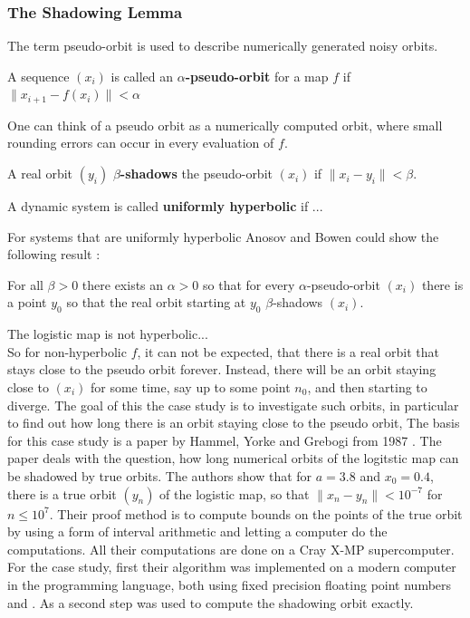  \subsubsection{The Shadowing Lemma}
 The term pseudo-orbit is used to describe numerically generated noisy orbits. 
 \begin{definition}\label{def:pseudoorbit}
 A sequence $(x_i)$ is called an \textbf{$\alpha$-pseudo-orbit} for a map $f$ if
 $ \| x_{i+1} - f(x_i) \| < \alpha $  
 \end{definition}
 One can think of a pseudo orbit as a numerically computed orbit, where small rounding errors can occur in every evaluation of $f$.
  \begin{definition}\label{def:shadowing}
	A real orbit $(y_i)$ \textbf{$\beta$-shadows} the pseudo-orbit $(x_i)$ if 
	$\| x_i - y_i \| < \beta$.  
 \end{definition}
 \begin{definition}
 A dynamic system is called \textbf{uniformly hyperbolic} if ...
 \end{definition}
  For systems that are uniformly hyperbolic Anosov and Bowen could show the following result \cite{anosov1967} \cite{Bowen1975} \cite{Hasselblatt:2008}:
  \begin{theorem}
  For all $\beta > 0$ there exists an $\alpha > 0$ so that for every $\alpha$-pseudo-orbit $(x_i)$ there is a point $y_0$ so that the real orbit starting at $y_0$ $\beta$-shadows $(x_i)$.
  \end{theorem} 
  The logistic map is not hyperbolic...\\
  So for non-hyperbolic $f$, it can not be expected, that there is a real orbit that stays close to the pseudo orbit forever.
  Instead, there will be an orbit staying close to $(x_i)$ for some time, say up to some point $n_0$, and then starting to diverge. 
  The goal of this the case study is to investigate such orbits, in particular to find out how long there is an orbit staying close to the pseudo orbit,
  The basis for this case study is a paper by Hammel, Yorke and Grebogi from 1987 \cite{Hammel1987}.
  The paper deals with the question, how long numerical orbits of the logitstic map can be shadowed by true orbits.
  The authors show that for $a = 3.8$ and $x_0 = 0.4$, there is a true orbit $(y_n)$ of the logistic map, so that $\| x_n - y_n \| < 10^{-7}$ for $n \leq 10^7$.
  Their proof method is to compute bounds on the points of the true orbit by using a form of interval arithmetic and letting a computer do the computations. 
  All their computations are done on a Cray X-MP supercomputer. 
  For the case study, first their algorithm was implemented on a modern computer in the \cc programming language, both using fixed precision floating point numbers and \irram. 
  As a second step \irram was used to compute the shadowing orbit exactly.
